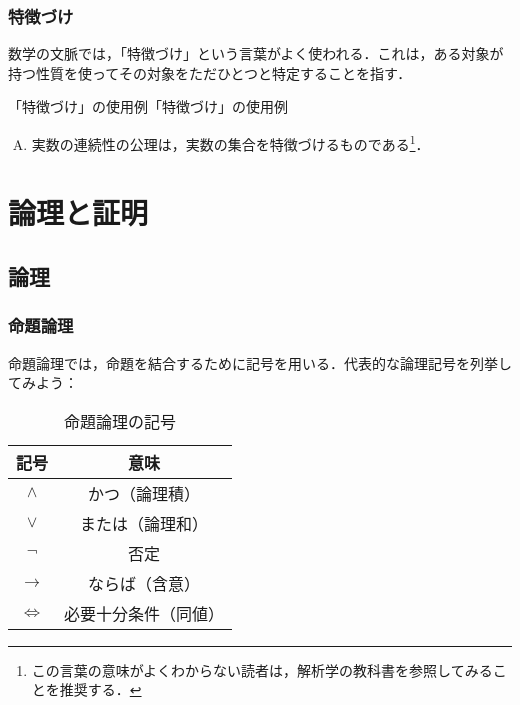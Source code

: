\documentclass[a4paper,11pt]{ltjsarticle}
\begin{document}
\subsubsection{特徴づけ}

数学の文脈では，「特徴づけ」という言葉がよく使われる．これは，ある対象が持つ性質を使ってその対象をただひとつと特定することを指す．

\begin{example}{「特徴づけ」の使用例}{「特徴づけ」の使用例}
  \begin{enumerate}[(A)]
    \item 実数の連続性の公理は，実数の集合を特徴づけるものである\footnote{この言葉の意味がよくわからない読者は，解析学の教科書を参照してみることを推奨する．}．
  \end{enumerate}
\end{example}

\newpage

\section{論理と証明}
\subsection{論理}
\subsubsection{命題論理}

命題論理では，命題を結合するために記号を用いる．代表的な論理記号を列挙してみよう：

\begin{table}[ht]
  \centering
  \caption{命題論理の記号}
  \begin{tabular}{c|c}
    \hline
    記号                & 意味                       \\
    \hline
    $\land$           & かつ（論理積\index{ろんりせき@論理積}） \\
    $\lor$            & または（論理和\index{ろんりわ@論理和}） \\
    $\lnot$           & 否定\index{ひてい@否定}         \\
    $\to$             & ならば（含意\index{がんい@含意}）    \\
    $\Leftrightarrow$ & 必要十分条件（同値）\index{どうち@同値} \\
    \hline
  \end{tabular}
\end{table}
\end{document}
